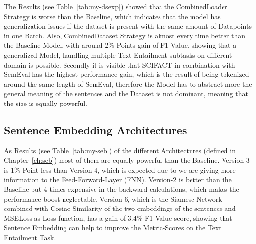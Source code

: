 The Results (see Table~\ref{tab:my-dsexp}) showed that the CombinedLoader Strategy is worse than the Baseline, 
which indicates that the model has generalization issues if the dataset is present
with the same amount of Datapoints in one Batch. Also, CombinedDataset Strategy is almost every
time better than the Baseline Model, with around 2\% Points gain of F1 Value, showing
that a generalized Model, handling multiple Text Entailment subtasks on different domain 
is possible. Secondly it is visible that SCIFACT in combination with SemEval has the highest
performance gain, which is the result of being tokenized around the same length of SemEval, therefore
the Model has to abstract more the general meaning of the sentences and the Dataset is not dominant,
meaning that the size is equally powerful.














\subsection{Sentence Embedding Architectures}

As Results (see Table~\ref{tab:my-seb}) of the different Architectures (defined in Chapter~\ref{ch:seb})
most of them are equally powerful than the Baseline. Version-3 is 1\% Point less than Version-4, which 
is expected due to we are giving more information to the Feed-Forward-Layer (FNN). Version-2 is better than
the Baseline but 4 times expensive in the backward calculations, which makes the performance boost neglectable.
Version-6, which is the Siamese-Network combined with Cosine Similarity of the two embeddings of the sentences
and MSELoss as Loss function, has a gain of 3.4\% F1-Value score, showing that Sentence Embedding can
help to improve the Metric-Scores on the Text Entailment Task.


